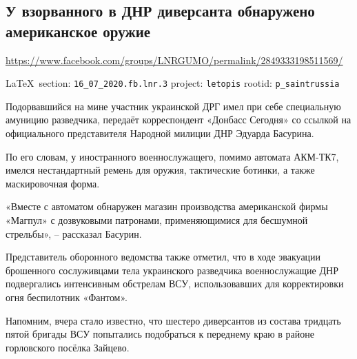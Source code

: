  
 
\subsection{У взорванного в ДНР диверсанта обнаружено американское оружие}
\url{https://www.facebook.com/groups/LNRGUMO/permalink/2849333198511569/}
  
\vspace{0.5cm}
{\ifDEBUG\small\LaTeX~section: \verb|16_07_2020.fb.lnr.3| project: \verb|letopis| rootid: \verb|p_saintrussia|\fi}
\vspace{0.5cm}
  
Подорвавшийся на мине участник украинской ДРГ имел при себе специальную амуницию разведчика, передаёт корреспондент «Донбасс Сегодня» со ссылкой на официального представителя Народной милиции ДНР Эдуарда Басурина.

По его словам, у иностранного военнослужащего, помимо автомата АКМ-ТК7, имелся нестандартный ремень для оружия, тактические ботинки, а также маскировочная форма.

«Вместе с автоматом обнаружен магазин производства американской фирмы «Магпул» с дозвуковыми патронами, применяющимися для бесшумной стрельбы», – рассказал Басурин.

Представитель оборонного ведомства также отметил, что в ходе эвакуации брошенного сослуживцами тела украинского разведчика военнослужащие ДНР подвергались интенсивным обстрелам ВСУ, использовавших для корректировки огня беспилотник «Фантом».

Напомним, вчера стало известно, что шестеро диверсантов из состава тридцать пятой бригады ВСУ попытались подобраться к переднему краю в районе горловского посёлка Зайцево.
